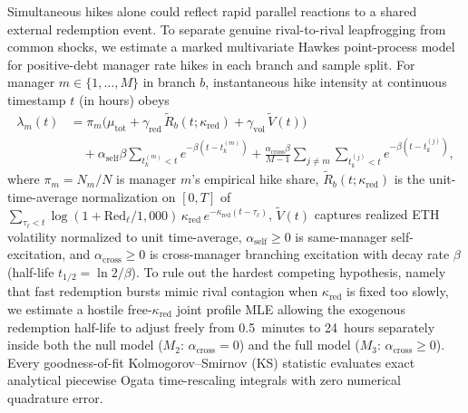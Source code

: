 Simultaneous hikes alone could reflect rapid parallel reactions to a shared external redemption event. To separate genuine rival-to-rival leapfrogging from common shocks, we estimate a marked multivariate Hawkes point-process model \citep{hawkes1971spectra,ogata1988statistical} for positive-debt manager rate hikes in each branch and sample split. For manager $m \in \{1, \dots, M\}$ in branch $b$, instantaneous hike intensity at continuous timestamp $t$ (in hours) obeys
\begin{equation}\label{eq:hawkes}
\begin{aligned}
\lambda_{m}(t) &= \pi_m\bigl(\mu_{\text{tot}} + \gamma_{\text{red}}\,\tilde{R}_b(t; \kappa_{\text{red}}) + \gamma_{\text{vol}}\,\tilde{V}(t)\bigr) \\
&\quad + \alpha_{\text{self}} \beta \sum_{t_k^{(m)} < t} e^{-\beta(t - t_k^{(m)})}
+ \frac{\alpha_{\text{cross}} \beta}{M - 1} \sum_{j \ne m} \sum_{t_k^{(j)} < t} e^{-\beta(t - t_k^{(j)})},
\end{aligned}
\end{equation}
where $\pi_m = N_m / N$ is manager $m$'s empirical hike share, $\tilde{R}_b(t; \kappa_{\text{red}})$ is the unit-time-average normalization on $[0, T]$ of $\sum_{\tau_\ell < t} \log(1 + \text{Red}_{\ell}/1{,}000)\,\kappa_{\text{red}}\,e^{-\kappa_{\text{red}}(t - \tau_\ell)}$, $\tilde{V}(t)$ captures realized ETH volatility normalized to unit time-average, $\alpha_{\text{self}} \ge 0$ is same-manager self-excitation, and $\alpha_{\text{cross}} \ge 0$ is cross-manager branching excitation with decay rate $\beta$ (half-life $t_{1/2} = \ln 2 / \beta$). To rule out the hardest competing hypothesis, namely that fast redemption bursts mimic rival contagion when $\kappa_{\text{red}}$ is fixed too slowly, we estimate a hostile free-$\kappa_{\text{red}}$ joint profile MLE allowing the exogenous redemption half-life to adjust freely from 0.5~minutes to 24~hours separately inside both the null model ($M_2$: $\alpha_{\text{cross}} = 0$) and the full model ($M_3$: $\alpha_{\text{cross}} \ge 0$). Every goodness-of-fit Kolmogorov--Smirnov (KS) statistic evaluates exact analytical piecewise Ogata time-rescaling integrals with zero numerical quadrature error.

